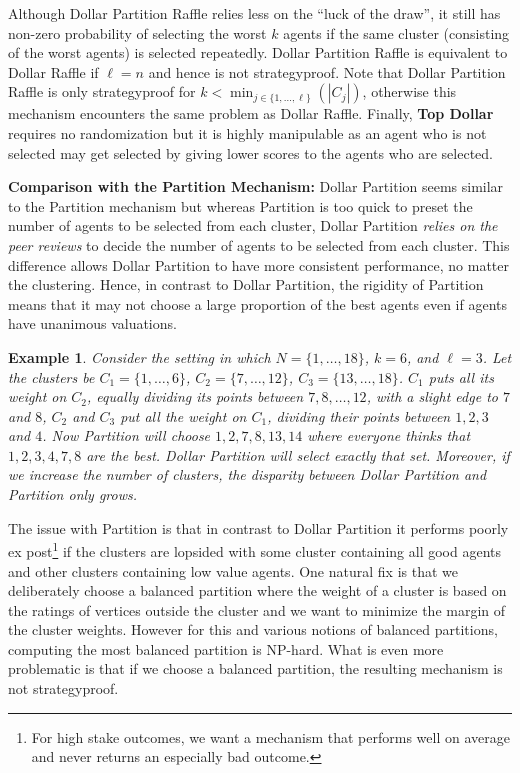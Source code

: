 \documentclass[letterpaper]{article}
\newtheorem{example}[theorem]{Example}
\begin{document}
Although Dollar Partition Raffle relies less on the ``luck of the draw'', it still has non-zero probability of selecting the worst $k$ agents if the same cluster (consisting of the worst agents) is selected repeatedly. %
Dollar Partition Raffle is equivalent to Dollar Raffle if $\ell=n$ and hence is not strategyproof. Note that Dollar Partition Raffle is only strategyproof for $k<\min_{j\in \{1, \ldots, \ell\}}(|C_{j}|)$, otherwise this mechanism encounters the same problem as Dollar Raffle.
Finally, \textbf{Top Dollar} requires no randomization but it is highly manipulable as an agent who is not selected may get selected by giving lower scores to the agents who are selected.

\smallskip
\noindent
\textbf{Comparison with the Partition Mechanism:}
Dollar Partition seems similar to the Partition mechanism but whereas Partition is too quick to preset the number of agents to be selected from each cluster, Dollar Partition \emph{relies on the peer reviews} to decide the number of agents to be selected from each cluster. This difference allows Dollar Partition to have more consistent performance, no matter the clustering. Hence, in contrast to Dollar Partition, the rigidity of Partition means that it may not choose a large proportion of the best agents even if agents have unanimous valuations.

\begin{example}
Consider the setting in which	$N=\{1,\ldots, 18\}$, $k=6$, and $\ell=3$. Let the clusters be $C_1=\{1,\ldots, 6\}$, $C_2=\{7,\ldots, 12\}$, $C_3=\{13,\ldots, 18\}$. $C_1$ puts all its weight on $C_2$, equally dividing its points between $7,8,\ldots,12$, with a slight edge to $7$ and $8$, $C_2$ and $C_3$ put all the weight on $C_1$, dividing their points between $1,2,3$ and $4$. Now Partition will choose $1,2,7,8,13,14$ where everyone thinks that $1,2,3,4,7,8$ are the best. Dollar Partition will select exactly that set. Moreover, if we increase the number of clusters, the disparity between Dollar Partition and Partition only grows.
	\end{example}

The issue with Partition is that in contrast to Dollar Partition it performs poorly ex post\footnote{For high stake outcomes, we want a mechanism that performs well on average and never returns an especially bad outcome.} if the clusters are lopsided with some cluster containing all good agents and other clusters containing low value agents. One natural fix is that we deliberately choose a balanced partition where the weight of a cluster is based on the ratings of vertices outside the cluster and we want to minimize the margin of the cluster weights.
However for this and various notions of balanced partitions, computing the most balanced partition is NP-hard. What is even more problematic is that if we choose a balanced partition, the resulting mechanism is not strategyproof.%
\end{document}
